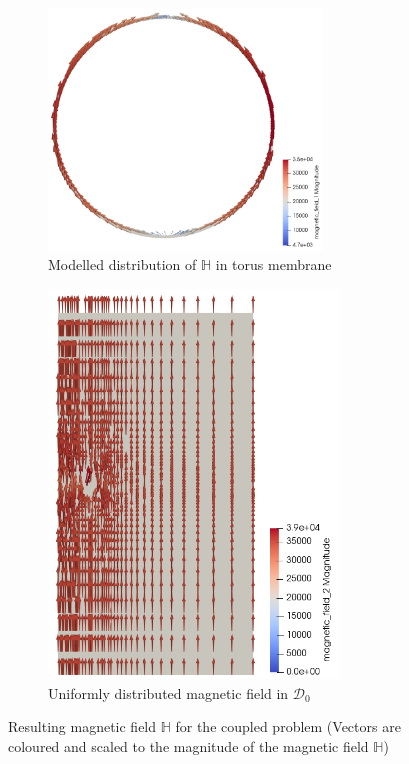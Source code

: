 \documentclass[11pt,a4paper,final]{article}
\begin{document}
\begin{figure}[h!]
\centering
\begin{subfigure}{0.59\textwidth}
\centering
\includegraphics[width=0.8\textwidth]{magnetic_field_toroid_coupled.png}
\caption{Modelled distribution of $\mathbb{H}$ in torus membrane}
\label{fig:3.5.1}
\end{subfigure}
\begin{subfigure}{0.39\textwidth}
\centering
\includegraphics[width=0.85\textwidth]{magnetic_field_50.png}
\caption{Uniformly distributed magnetic field in $\mathcal{D}_0$}
\label{fig:3.5.2}
\end{subfigure}
\caption{Resulting magnetic field $\mathbb{H}$ for the coupled problem (Vectors are coloured and scaled to the magnitude of the magnetic field $\mathbb{H}$)}
\label{fig:3.5}
\end{figure}
\end{document}
